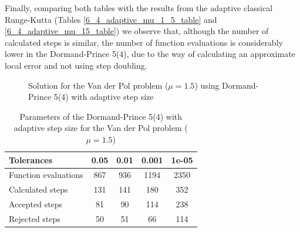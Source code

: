 Finally, comparing both tables with the results from the adaptive classical Runge-Kutta (Tables \ref{6_4_adaptive_mu_1_5_table} and \ref{6_4_adaptive_mu_15_table}) we observe that, although the number of calculated steps is similar, the number of function evaluations is considerably lower in the Dormand-Prince 5(4), due to the way of calculating an approximate local error and not using step doubling.

\begin{figure}[H]
    \centering
    \caption{Solution for the Van der Pol problem ($\mathit{\mu = 1.5}$) using Dormand-Prince 5(4) with adaptive step size}
    \label{7_4_mu_1_5}
\end{figure}

\begin{table}[H]
    \centering
    \begin{tabular}{@{}l|cccc@{}}
    \toprule
    Tolerances           & 0.05 & 0.01 & 0.001 & 1e-05 \\ \midrule
    Function evaluations & 867  & 936  & 1194  & 2350  \\
    Calculated steps     & 131  & 141  & 180   & 352   \\
    Accepted steps       & 81   & 90   & 114   & 238   \\
    Rejected steps       & 50   & 51   & 66    & 114   \\ \bottomrule
    \end{tabular}
    \caption{Parameters of the Dormand-Prince 5(4) with adaptive step size for the Van der Pol problem ($\mathit{\mu = 1.5}$)}
    \label{7_4_adaptive_mu_1_5_table}
\end{table}

